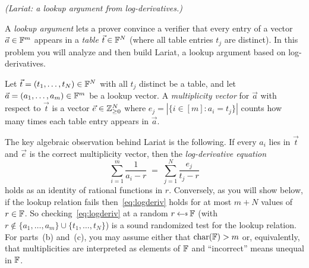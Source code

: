 \begin{questions}

	\question \emph{(Lariat: a lookup argument from log-derivatives.)}

	A \emph{lookup argument} lets a prover convince a verifier that every entry of a vector $\vec{a} \in \mathbb{F}^m$ appears in a \emph{table} $\vec{t} \in \mathbb{F}^N$ (where all table entries $t_j$ are distinct).  In this problem you will analyze and then build Lariat, a lookup argument based on log-derivatives.

	  Let $\vec{t} = (t_1, \ldots, t_N) \in \mathbb{F}^N$ with all $t_j$ distinct be a table, and let $\vec{a} = (a_1, \ldots, a_m) \in \mathbb{F}^m$ be a lookup vector.  A \emph{multiplicity vector} for $\vec{a}$ with respect to $\vec{t}$ is a vector $\vec{e} \in \mathbb{Z}_{\geq 0}^N$ where $e_j = |\{i \in [m] : a_i = t_j\}|$ counts how many times each table entry appears in $\vec{a}$.

	The key algebraic observation behind Lariat is the following.  If every $a_i$ lies in $\vec{t}$ and $\vec{e}$ is the correct multiplicity vector, then the \emph{log-derivative equation}
	\begin{equation}
		\sum_{i=1}^{m} \frac{1}{a_i - r} \;=\; \sum_{j=1}^{N} \frac{e_j}{t_j - r} \tag{$\star$} \label{eq:logderiv}
	\end{equation}
	holds as an identity of rational functions in $r$.  Conversely, as you will show below, if the lookup relation fails then~\eqref{eq:logderiv} holds for at most $m + N$ values of $r \in \mathbb{F}$.  So checking~\eqref{eq:logderiv} at a random $r \getsr \F$ (with $r \notin \{a_1,\ldots,a_m\}\cup\{t_1,\ldots,t_N\}$) is a sound randomized test for the lookup relation.  For parts~(b) and~(c), you may assume either that $\mathrm{char}(\mathbb{F}) > m$ or, equivalently, that multiplicities are interpreted as elements of $\mathbb{F}$ and ``incorrect'' means unequal in $\mathbb{F}$.


\end{questions}

